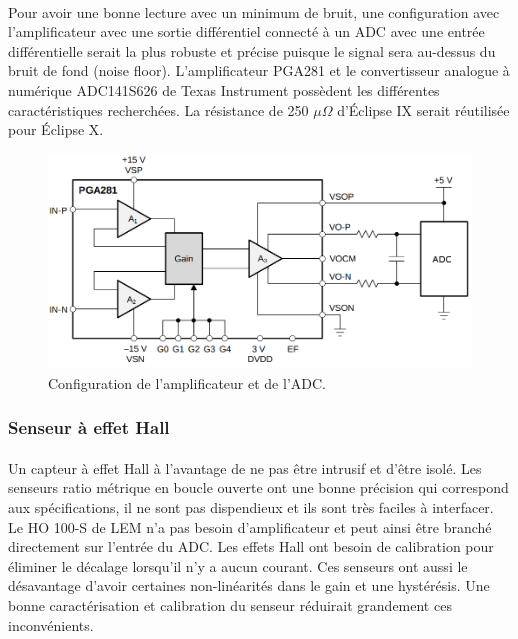 	\paragraph*{}
	Pour avoir une bonne lecture avec un minimum de bruit, une configuration avec l'amplificateur avec une sortie différentiel connecté à un ADC avec une entrée différentielle serait la plus robuste et précise puisque le signal sera au-dessus du bruit de fond (noise floor). L'amplificateur PGA281 et le convertisseur analogue à numérique ADC141S626 de Texas Instrument possèdent les différentes caractéristiques recherchées. La résistance de 250 $\mu \Omega$ d'Éclipse IX serait réutilisée pour Éclipse X.
	
	\begin{figure}[H]
		\centering
		\includegraphics[scale = 0.4]{Images/current_sense_shunt.png}
		\caption{Configuration de l'amplificateur et de l'ADC.}
		\label{fig:current_sense_shunt}
	\end{figure}
	
	\subsubsection*{Senseur à effet Hall}
	\paragraph*{}	
	Un capteur à effet Hall à l'avantage de ne pas être intrusif et d'être isolé. Les senseurs ratio métrique en boucle ouverte ont une bonne précision qui correspond aux spécifications, il ne sont pas dispendieux et ils sont très faciles à interfacer. Le HO 100-S de LEM n'a pas besoin d'amplificateur et peut ainsi être branché directement sur l'entrée du ADC. Les effets Hall ont besoin de calibration pour éliminer le décalage lorsqu'il n'y a aucun courant. Ces senseurs ont aussi le désavantage d'avoir certaines non-linéarités dans le gain et une hystérésis. Une bonne caractérisation et calibration du senseur réduirait grandement ces inconvénients.
	
